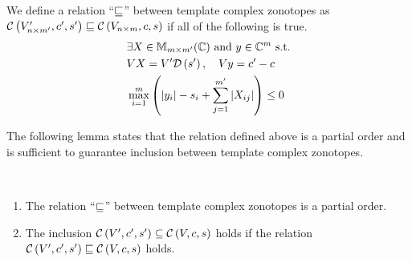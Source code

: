 %
\begin{definition}
We define a relation ``$\order$'' between template complex zonotopes
as\\ $\cz{V^\pr_{n\times m^\pr}}{c^\pr}{s^\pr}\order \cz{V_{n\times
    m}}{c}{s}$ if all of the following is true.
\begin{align}
\begin{split}
& \exists X\in\mat{m}{m^\pr}{\mb{C}}~\text{and}~y\in\mb{C}^{m}~\text{s.t.}\\
& \transfer{V}{V^\pr}{s^\pr}{X},~~~\centertransfer{V}{c}{c^\pr}{y}\\
& \scalebound{X}{y}{s}{m}{m^\pr}\leq 0\\
\end{split}
\end{align}
\end{definition}
%
The following lemma states that the relation defined above is a partial
order and is sufficient to
guarantee inclusion between template complex zonotopes.

\begin{lemma}~\label{lem:zon-zon}
\begin{enumerate}
\item The relation ``$\order$'' between template complex zonotopes is
  a partial order.
\item The inclusion $\cz{V^\pr}{c^\pr}{s^\pr}\subseteq
  \cz{V}{c}{s}$ holds if the
  relation\\ $\cz{{V^\pr}}{c^\pr}{s^\pr}\order
  \cz{V}{c}{s}$ holds.
\end{enumerate}
\end{lemma}



